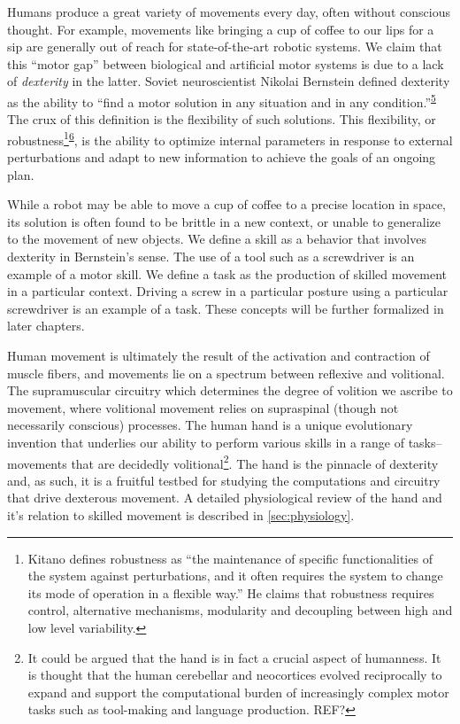 \documentclass[
  a4paper,
]{article}
\begin{document}
Humans produce a great variety of movements every day, often without
conscious thought. For example, movements like bringing a cup of coffee
to our lips for a sip are generally out of reach for state-of-the-art
robotic systems. We claim that this ``motor gap'' between biological and
artificial motor systems is due to a lack of \emph{dexterity} in the
latter. Soviet neuroscientist Nikolai Bernstein defined dexterity as the
ability to ``find a motor solution in any situation and in any
condition.''\textsuperscript{\protect\hyperlink{ref-Bernstein1967}{5}}
The crux of this definition is the flexibility of such solutions. This
flexibility, or
robustness\footnote{Kitano defines robustness as ``the maintenance of
  specific functionalities of the system against perturbations, and it
  often requires the system to change its mode of operation in a
  flexible way.'' He claims that robustness requires control,
  alternative mechanisms, modularity and decoupling between high and low
  level variability.}\textsuperscript{\protect\hyperlink{ref-kitanoBiologicalRobustness2004}{6}},
is the ability to optimize internal parameters in response to external
perturbations and adapt to new information to achieve the goals of an
ongoing plan.

While a robot may be able to move a cup of coffee to a precise location
in space, its solution is often found to be brittle in a new context, or
unable to generalize to the movement of new objects. We define a skill
as a behavior that involves dexterity in Bernstein's sense. The use of a
tool such as a screwdriver is an example of a motor skill. We define a
task as the production of skilled movement in a particular context.
Driving a screw in a particular posture using a particular screwdriver
is an example of a task. These concepts will be further formalized in
later chapters.

Human movement is ultimately the result of the activation and
contraction of muscle fibers, and movements lie on a spectrum between
reflexive and volitional. The supramuscular circuitry which determines
the degree of volition we ascribe to movement, where volitional movement
relies on supraspinal (though not necessarily conscious) processes. The
human hand is a unique evolutionary invention that underlies our ability
to perform various skills in a range of tasks-- movements that are
decidedly volitional\footnote{It could be argued that the hand is in
  fact a crucial aspect of humanness. It is thought that the human
  cerebellar and neocortices evolved reciprocally to expand and support
  the computational burden of increasingly complex motor tasks such as
  tool-making and language production. REF?}. The hand is the pinnacle
of dexterity and, as such, it is a fruitful testbed for studying the
computations and circuitry that drive dexterous movement. A detailed
physiological review of the hand and it's relation to skilled movement
is described in \cref{sec:physiology}.
\end{document}

